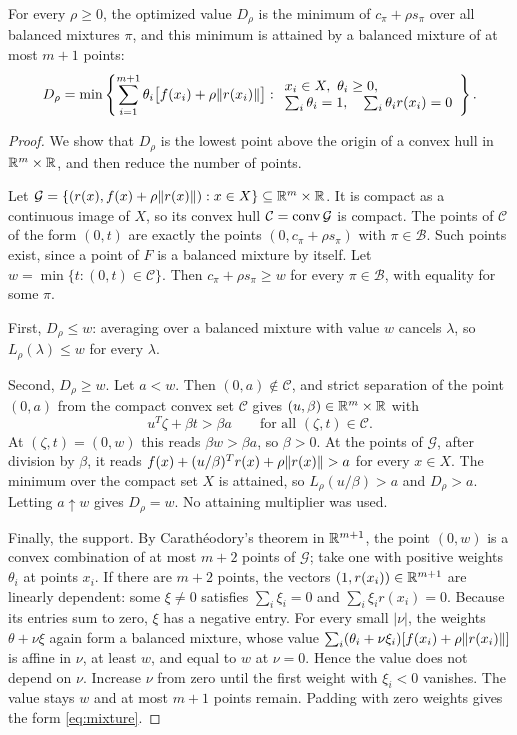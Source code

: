 \begin{proposition}\label{prop:mixture}
For every $\rho\ge0$, the optimized value $D_\rho$ is the minimum of
$c_\pi+\rho s_\pi$ over all balanced mixtures $\pi$, and this minimum is
attained by a balanced mixture of at most $m+1$ points:
\begin{equation}\label{eq:mixture}
 D_\rho=\min\left\{\sum_{i=1}^{m+1}\theta_i
 \bigl[f(x_i)+\rho\lVert r(x_i)\rVert\bigr]:
 \begin{array}{l}
 x_i\in X,\ \theta_i\ge0,\\
 \sum_i\theta_i=1,\quad\sum_i\theta_i r(x_i)=0
 \end{array}\right\}.
\end{equation}
\end{proposition}
\begin{proof}
We show that $D_\rho$ is the lowest point above the origin of a convex
hull in $\mathbb R^m\times\mathbb R$, and then reduce the number of points.

Let $\mathcal G=\{(r(x),f(x)+\rho\lVert r(x)\rVert):x\in X\}\subseteq\mathbb R^m\times\mathbb R$.
It is compact as a continuous image of $X$, so its convex hull
$\mathcal C=\operatorname{conv}\mathcal G$ is compact. The points of $\mathcal C$ of
the form $(0,t)$ are exactly the points $(0,c_\pi+\rho s_\pi)$ with
$\pi\in\mathcal B$. Such points exist, since a point of $F$ is a
balanced mixture by itself. Let $w=\min\{t:(0,t)\in\mathcal C\}$. Then
$c_\pi+\rho s_\pi\ge w$ for every $\pi\in\mathcal B$, with equality for
some $\pi$.

First, $D_\rho\le w$: averaging over a balanced mixture with value $w$
cancels $\lambda$, so $L_\rho(\lambda)\le w$ for every $\lambda$.

Second, $D_\rho\ge w$. Let $a<w$. Then $(0,a)\notin\mathcal C$, and
strict separation of the point $(0,a)$ from the compact convex set
$\mathcal C$ gives $(u,\beta)\in\mathbb R^m\times\mathbb R$ with
\[
 u^T\zeta+\beta t>\beta a\qquad\text{for all }(\zeta,t)\in\mathcal C.
\]
At $(\zeta,t)=(0,w)$ this reads $\beta w>\beta a$, so $\beta>0$.
At the points of $\mathcal G$, after division by $\beta$, it reads
$f(x)+(u/\beta)^Tr(x)+\rho\lVert r(x)\rVert>a$ for every $x\in X$. The
minimum over the compact set $X$ is attained, so $L_\rho(u/\beta)>a$
and $D_\rho>a$. Letting $a\uparrow w$ gives $D_\rho=w$. No attaining
multiplier was used.

Finally, the support. By Carath\'eodory's theorem in $\mathbb R^{m+1}$, the
point $(0,w)$ is a convex combination of at most $m+2$ points of
$\mathcal G$; take one with positive weights $\theta_i$ at points
$x_i$. If there are $m+2$ points, the vectors $(1,r(x_i))\in\mathbb R^{m+1}$
are linearly dependent: some $\xi\ne0$ satisfies $\sum_i\xi_i=0$
and $\sum_i\xi_ir(x_i)=0$. Because its entries sum to zero, $\xi$
has a negative entry. For every small $|\nu|$, the weights
$\theta+\nu\xi$ again form a balanced mixture, whose value
$\sum_i(\theta_i+\nu\xi_i)[f(x_i)+\rho\lVert r(x_i)\rVert]$ is affine
in $\nu$, at least $w$, and equal to $w$ at $\nu=0$. Hence the
value does not depend on $\nu$. Increase $\nu$ from zero until
the first weight with $\xi_i<0$ vanishes. The value stays $w$ and at
most $m+1$ points remain. Padding with zero weights gives the form
\eqref{eq:mixture}.
\end{proof}

